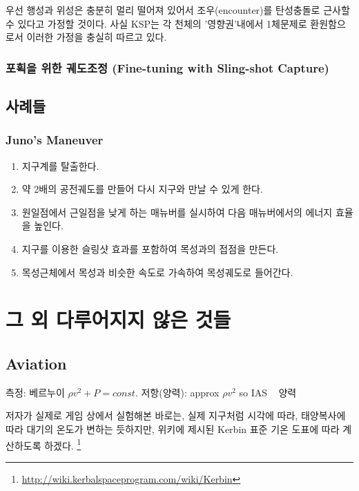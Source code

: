\documentclass[9pt]{amsbook}
\begin{document}
우선 행성과 위성은 충분히 멀리 떨어져 있어서 조우(encounter)를 탄성충돌로 근사할 수 있다고 가정할 것이다. 사실 KSP는 각 천체의 '영향권'내에서 1체문제로 환원함으로서 이러한 가정을 충실히 따르고 있다.
\section{포획을 위한 궤도조정 (Fine-tuning with Sling-shot Capture)}

\chapter{사례들}
\section{Juno's Maneuver}
\begin{enumerate}
\item 지구계를 탈출한다.
\item 약 2배의 공전궤도를 만들어 다시 지구와 만날 수 있게 한다.
\item 원일점에서 근일점을 낮게 하는 매뉴버를 실시하여 다음 매뉴버에서의 에너지 효율을 높인다.
\item 지구를 이용한 슬링샷 효과를 포함하여 목성과의 접점을 만든다.
\item 목성근체에서 목성과 비슷한 속도로 가속하여 목성궤도로 들어간다.
\end{enumerate}
\part{그 외 다루어지지 않은 것들}
\chapter{Aviation}
측정: 베르누이 $\rho v^2 + P = const$. 
저항(양력): approx $\rho v^2$ so IAS ~ 양력

저자가 실제로 게임 상에서 실험해본 바로는, 실제 지구처럼 시각에 따라, 태양복사에 따라 대기의 온도가 변하는 듯하지만, 위키에 제시된 Kerbin 표준 기온 도표에 따라 계산하도록 하겠다. \footnote{\url{http://wiki.kerbalspaceprogram.com/wiki/Kerbin}}
\end{document}

